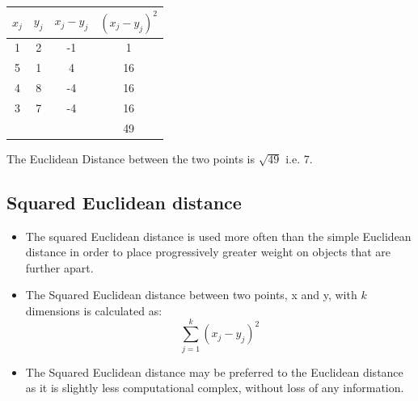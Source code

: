 \documentclass[a4paper,12pt]{report}
\begin{document}
\begin{center}
	\begin{tabular}{|c|c|c|c|}
		\hline
		$x_j$	&	$y_j$	&   $x_j - y_j$	&	$(x_j - y_j)^2$	\\ \hline
		1	&	2	&	-1	&	1	\\
		5	&	1	&	4	&	16	\\
		4	&	8	&	-4	&	16	\\
		3	&	7	&	-4	&	16	\\ \hline
		&		&		&	49	\\ \hline
	\end{tabular}
\end{center}
The Euclidean Distance between the two points is $\sqrt{49}$ i.e. 7.










\subsection{Squared Euclidean distance}

\begin{itemize}
\item The squared Euclidean distance is used more often than the simple Euclidean distance in order to place progressively greater weight on objects that are further apart. 


\item The Squared Euclidean distance between two points, x and y, with $k$ dimensions is calculated as:
\[ \sum^{k}_{j=1} ( x_j - y_j)^2  \]
\item The Squared Euclidean distance may be preferred to the Euclidean distance as it is slightly less computational complex, without loss of any information.
\end{itemize}



\end{document}
